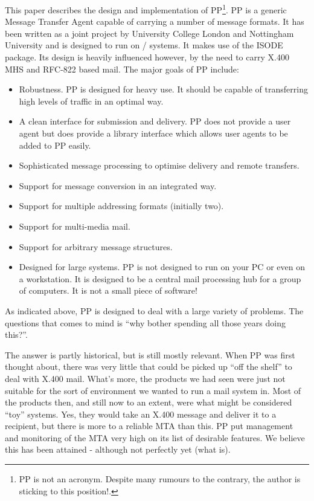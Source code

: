 This paper describes the design and implementation of PP\footnote{PP
is not an acronym. Despite many rumours to the contrary, the author is
sticking to this position!.}. PP is a generic Message Transfer Agent
capable of carrying a number of message formats. It has been written
as a joint project by University College London and Nottingham
University and is designed to run on \unix/ systems. It makes
use of the ISODE package\cite{ISODE}.  Its design is heavily
influenced however, by the need to carry X.400 MHS\cite{CCITT.MHS} and
RFC-822\cite{RFC822} based mail. The major goals of PP include:
\begin{itemize}
\item	Robustness. PP is designed for heavy use. It should be
capable of transferring high levels of traffic in an optimal way.

\item	A clean interface for submission and delivery. PP does not
provide a user agent but does provide a library interface which allows
user agents to be added to PP easily.

\item	Sophisticated message processing to optimise delivery and
remote transfers.

\item	Support for message conversion in an integrated way.

\item	Support for multiple addressing formats (initially two).

\item	Support for multi-media mail.

\item	Support for arbitrary message structures.

\item	Designed for large systems. PP is not designed to run on your
PC or even on a workstation. It is designed to be a central mail
processing hub for a group of computers. It is not a small piece of
software!
\end{itemize}

As indicated above, PP is designed to deal with a large variety of
problems. The questions that comes to mind is ``why bother spending
all those years doing this?''. 

The answer is partly historical, but is still mostly relevant. When PP
was first thought about, there was very little that could be picked up
``off the shelf'' to deal with X.400 mail. What's more, the products we
had seen were just not suitable for the sort of environment we wanted
to run a mail system in. Most of the products then, and still now to
an extent, were what might be considered ``toy'' systems. Yes, they
would take an X.400 message and deliver it to a recipient, but there
is more to a reliable MTA than this. PP put management and monitoring
of the MTA very high on its list of desirable features. We believe
this has been attained - although not perfectly yet (what is).

